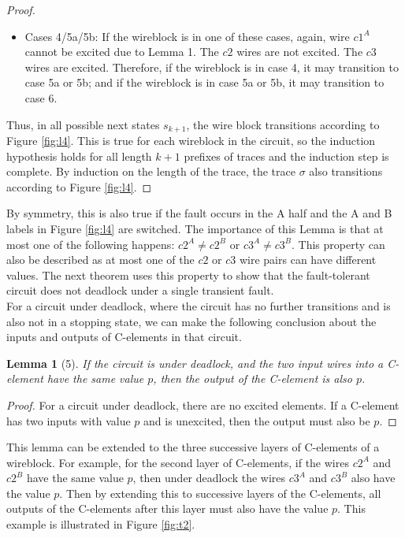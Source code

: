 \documentclass[12pt]{report}
\newtheorem*{lemma}{Lemma}
\begin{document}
\begin{proof}
\begin{itemize}
\item
Cases 4/5a/5b:   If the wireblock is in one of these cases, again, wire $c1^A$ cannot be excited due to Lemma 1.  The $c2$ wires are not excited.  The $c3$ wires are excited.  Therefore, if the wireblock is in case 4, it may transition to case 5a or 5b; and if the wireblock is in case 5a or 5b, it may transition to case 6.
\end{itemize}
Thus, in all possible next states $s_{k+1}$, the wire block transitions according to Figure \ref{fig:l4}.  This is true for each wireblock in the circuit, so the induction hypothesis holds for all length $k+1$ prefixes of traces and the induction step is complete.  
By induction on the length of the trace, the trace $\sigma$ also transitions according to Figure \ref{fig:l4}.  
\end{proof}
By symmetry, this is also true if the fault occurs in the A half and the A and B labels in Figure \ref{fig:l4} are switched.  
The importance of this Lemma is that at most one of the following happens: $c2^A\neq c2^B$ or $c3^A\neq c3^B$.  This property can also be described as at most one of the $c2$ or $c3$ wire pairs can have different values.  The next theorem uses this property to show that the fault-tolerant circuit does not deadlock under a single transient fault.\\

For a circuit under deadlock, where the circuit has no further transitions and is also not in a stopping state, we can make the following conclusion about the inputs and outputs of C-elements in that circuit.
\begin{lemma}[5]
If the circuit is under deadlock, and the two input wires into a C-element have the same value $p$, then the output of the C-element is also $p$.
\end{lemma}
\begin{proof}
For a circuit under deadlock, there are no excited elements.  If a C-element has two inputs with value $p$ and is unexcited, then the output must also be $p$.
\end{proof}
This lemma can be extended to the three successive layers of C-elements of a wireblock.  For example, for the second layer of C-elements, if the wires $c2^A$ and $c2^B$ have the same value $p$, then under deadlock the wires $c3^A$ and $c3^B$ also have the value $p$.  Then by extending this to successive layers of the C-elements, all outputs of the C-elements after this layer must also have the value $p$.  This example is illustrated in Figure \ref{fig:t2}.
\end{document}
